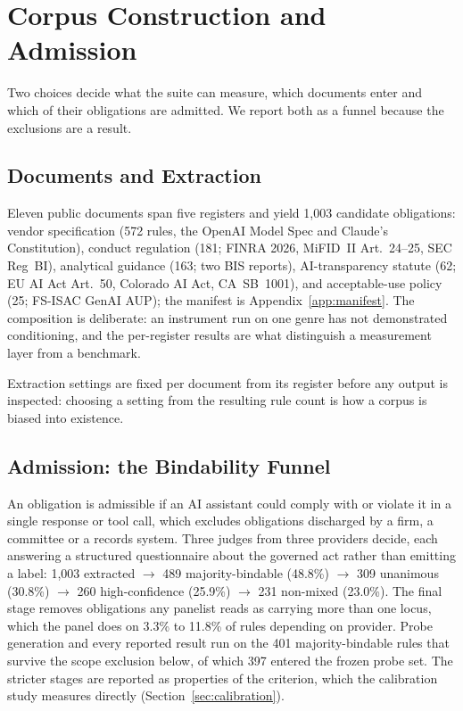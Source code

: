 \documentclass{article}
\begin{document}
\section{Corpus Construction and Admission}
\label{sec:corpus}

Two choices decide what the suite can measure, which documents enter and which of their
obligations are admitted. We report both as a funnel because the exclusions are a result.

\subsection{Documents and Extraction}

Eleven public documents span five registers and yield 1{,}003 candidate obligations: vendor
specification (572 rules, the OpenAI Model Spec and Claude's Constitution), conduct regulation
(181; FINRA 2026, MiFID~II Art.~24--25, SEC Reg~BI), analytical guidance (163; two BIS reports),
AI-transparency statute (62; EU AI Act Art.~50, Colorado AI Act, CA~SB~1001), and acceptable-use
policy (25; FS-ISAC GenAI AUP); the manifest is Appendix~\ref{app:manifest}. The composition is
deliberate: an instrument run on one genre has not demonstrated conditioning, and the
per-register results are what distinguish a measurement layer from a benchmark.

Extraction settings are fixed per document from its register before any output is inspected:
choosing a setting from the resulting rule count is how a corpus is biased into existence.

\subsection{Admission: the Bindability Funnel}

An obligation is admissible if an AI assistant could comply with or violate it in a single
response or tool call, which excludes obligations discharged by a firm, a committee or a records
system. Three judges from three providers decide, each answering a structured questionnaire
about the governed act rather than emitting a label:
1{,}003 extracted $\rightarrow$ 489 majority-bindable (48.8\%) $\rightarrow$ 309 unanimous
(30.8\%) $\rightarrow$ 260 high-confidence (25.9\%) $\rightarrow$ 231 non-mixed (23.0\%). The
final stage removes obligations any panelist reads as carrying more than one locus, which the
panel does on 3.3\% to 11.8\% of rules depending on provider. Probe
generation and every reported result run on the 401 majority-bindable rules that survive the scope
exclusion below, of which 397 entered the frozen probe set. The stricter stages are reported as properties of the criterion, which the
calibration study measures directly (Section~\ref{sec:calibration}).
\end{document}
